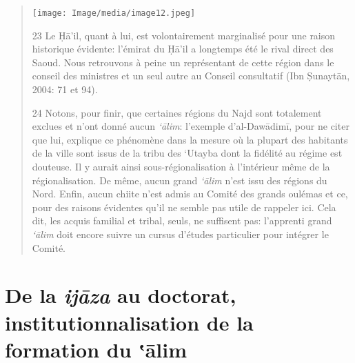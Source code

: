 \begin{quote}
\texttt{[image: Image/media/image12.jpeg]}

23 Le Ḥā'il, quant à lui, est volontairement marginalisé pour une raison
historique évidente: l'émirat du Ḥā'il a longtemps été le rival direct
des Saoud. Nous retrouvons à peine un représentant de cette région dans
le conseil des ministres et un seul autre au Conseil consultatif (Ibn
Ṣunaytān, 2004: 71 et 94).

24 Notons, pour finir, que certaines régions du Najd sont totalement
exclues et n'ont donné aucun \emph{`ālim}: l'exemple d'al-Dawādimī, pour
ne citer que lui, explique ce phénomène dans la mesure où la plupart des
habitants de la ville sont issus de la tribu des `Utayba dont la
fidélité au régime est douteuse. Il y aurait ainsi sous-régionalisation
à l'intérieur même de la régionalisation. De même, aucun grand
\emph{`ālim} n'est issu des régions du Nord. Enfin, aucun chiite n'est
admis au Comité des grands oulémas et ce, pour des raisons évidentes
qu'il ne semble pas utile de rappeler ici. Cela dit, les acquis familial
et tribal, seuls, ne suffisent pas: l'apprenti grand \emph{`ālim} doit
encore suivre un cursus d'études particulier pour intégrer le Comité.
\end{quote}

\hypertarget{de-la-ijux101za-au-doctorat-institutionnalisation-de-la-formation-du-ux101lim}{%
\section{\texorpdfstring{De la \emph{ijāza} au doctorat,
institutionnalisation de la formation du
‛ālim}{De la ijāza au doctorat, institutionnalisation de la formation du ‛ālim}}\label{de-la-ijux101za-au-doctorat-institutionnalisation-de-la-formation-du-ux101lim}}

